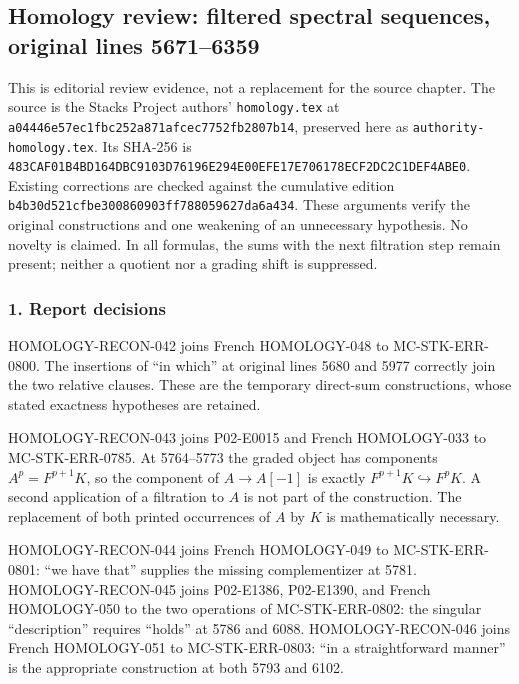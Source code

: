 \subsection{Homology review: filtered spectral sequences, original lines 5671--6359}\label{homology-review-filtered-spectral-sequences-original-lines-56716359}

This is editorial review evidence, not a replacement for the source chapter. The source is the Stacks Project authors' \texttt{homology.tex} at \texttt{a04446e57ec1fbc252a871afcec7752fb2807b14}, preserved here as \texttt{authority-homology.tex}. Its SHA-256 is \texttt{483CAF01B4BD164DBC9103D76196E294E00EFE17E706178ECF2DC2C1DEF4ABE0}. Existing corrections are checked against the cumulative edition \texttt{b4b30d521cfbe300860903ff788059627da6a434}. These arguments verify the original constructions and one weakening of an unnecessary hypothesis. No novelty is claimed. In all formulas, the sums with the next filtration step remain present; neither a quotient nor a grading shift is suppressed.

\subsubsection{1. Report decisions}\label{report-decisions}

HOMOLOGY-RECON-042 joins French HOMOLOGY-048 to MC-STK-ERR-0800. The insertions of ``in which'' at original lines 5680 and 5977 correctly join the two relative clauses. These are the temporary direct-sum constructions, whose stated exactness hypotheses are retained.

HOMOLOGY-RECON-043 joins P02-E0015 and French HOMOLOGY-033 to MC-STK-ERR-0785. At 5764--5773 the graded object has components \(A^p=F^{p+1}K\), so the component of \(A\to A[-1]\) is exactly \(F^{p+1}K\hookrightarrow F^pK\). A second application of a filtration to \(A\) is not part of the construction. The replacement of both printed occurrences of \(A\) by \(K\) is mathematically necessary.

HOMOLOGY-RECON-044 joins French HOMOLOGY-049 to MC-STK-ERR-0801: ``we have that'' supplies the missing complementizer at 5781. HOMOLOGY-RECON-045 joins P02-E1386, P02-E1390, and French HOMOLOGY-050 to the two operations of MC-STK-ERR-0802: the singular ``description'' requires ``holds'' at 5786 and 6088. HOMOLOGY-RECON-046 joins French HOMOLOGY-051 to MC-STK-ERR-0803: ``in a straightforward manner'' is the appropriate construction at both 5793 and 6102.

